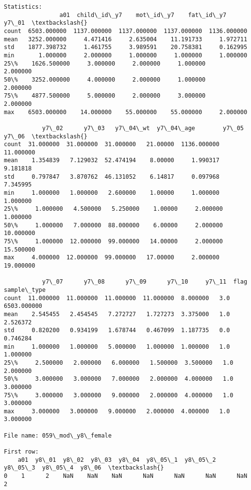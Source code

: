 \documentclass[11pt]{article}
\begin{document}
\begin{Verbatim}[commandchars=\\\{\}]
Statistics: 
                a01  child\_id\_y7    mot\_id\_y7    fat\_id\_y7        y7\_01  \textbackslash{}
count  6503.000000  1137.000000  1137.000000  1137.000000  1136.000000   
mean   3252.000000     4.471416     2.635004    11.191733     1.972711   
std    1877.398732     1.461755     3.989591    20.758381     0.162995   
min       1.000000     2.000000     1.000000     1.000000     1.000000   
25\%    1626.500000     3.000000     2.000000     1.000000     2.000000   
50\%    3252.000000     4.000000     2.000000     1.000000     2.000000   
75\%    4877.500000     5.000000     2.000000     3.000000     2.000000   
max    6503.000000    14.000000    55.000000    55.000000     2.000000   

           y7\_02      y7\_03   y7\_04\_wt  y7\_04\_age        y7\_05      y7\_06  \textbackslash{}
count  31.000000  31.000000  31.000000   21.00000  1136.000000  11.000000   
mean    1.354839   7.129032  52.474194    8.00000     1.990317   9.181818   
std     0.797847   3.870762  46.131052    6.14817     0.097968   7.345995   
min     1.000000   1.000000   2.600000    1.00000     1.000000   1.000000   
25\%     1.000000   4.500000   5.250000    1.00000     2.000000   1.000000   
50\%     1.000000   7.000000  88.000000    6.00000     2.000000  10.000000   
75\%     1.000000  12.000000  99.000000   14.00000     2.000000  15.500000   
max     4.000000  12.000000  99.000000   17.00000     2.000000  19.000000   

           y7\_07      y7\_08      y7\_09      y7\_10     y7\_11  flag  sample\_type  
count  11.000000  11.000000  11.000000  11.000000  8.000000   3.0  6503.000000  
mean    2.545455   2.454545   7.272727   1.727273  3.375000   1.0     2.526372  
std     0.820200   0.934199   1.678744   0.467099  1.187735   0.0     0.746284  
min     1.000000   1.000000   5.000000   1.000000  1.000000   1.0     1.000000  
25\%     2.500000   2.000000   6.000000   1.500000  3.500000   1.0     2.000000  
50\%     3.000000   3.000000   7.000000   2.000000  4.000000   1.0     3.000000  
75\%     3.000000   3.000000   9.000000   2.000000  4.000000   1.0     3.000000  
max     3.000000   3.000000   9.000000   2.000000  4.000000   1.0     3.000000  

File name: 059\_mod\_y8\_female

First row: 
    a01  y8\_01  y8\_02  y8\_03  y8\_04  y8\_05\_1  y8\_05\_2  y8\_05\_3  y8\_05\_4  y8\_06  \textbackslash{}
0    1      2    NaN    NaN    NaN      NaN      NaN      NaN      NaN      2   


\end{Verbatim}
\end{document}
